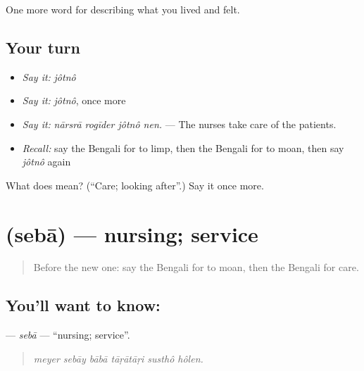\begin{grammarlens}[title={What you've built}]
One more word for describing what you lived and felt.
\end{grammarlens}

\subsection*{Your turn}
\begin{itemize}
\raggedright
  \item \emph{Say it:} \emph{jôtnô}
  \item \emph{Say it:} \emph{jôtnô}, once more
  \item \emph{Say it:} \emph{nārsrā rogīder jôtnô nen.} — The nurses take care of the patients.
  \item \emph{Recall:} say the Bengali for to limp, then the Bengali for to moan, then say \emph{jôtnô} again
\end{itemize}

\begin{tcolorbox}[breakable,colback=teal!4,colframe=teal!35!black,title={Before you move on}]
What does  mean? (\textquotedblleft{}Care; looking after\textquotedblright{}.) Say it once more.
\end{tcolorbox}
\section[\texorpdfstring{\bn{সেবা} (sebā)}{সেবা (sebā)}]{ (sebā) — nursing; service}

\label{lesson:BN-C478-seba}



\begin{quote}
Before the new one: say the Bengali for to moan, then the Bengali for care.
\end{quote}

\subsection*{You'll want to know: }
\textbf{} — \emph{sebā} — \textquotedblleft{}nursing; service\textquotedblright{}.

\begin{quote}
     
\end{quote}

\begin{quote}
\emph{meyer sebāy bābā tāṛātāṛi susthô hôlen.}
\end{quote}

